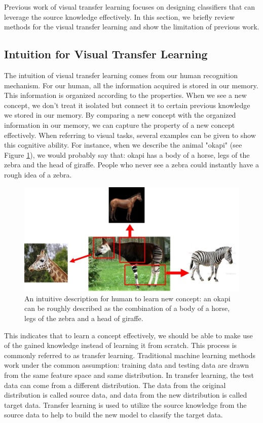 Previous work of visual transfer learning focuses on designing classifiers that can leverage the source knowledge effectively. In this section, we briefly review methods for the visual transfer learning and show the limitation of previous work. 
\subsection{Intuition for Visual Transfer Learning}
The intuition of visual transfer learning comes from our human recognition mechanism. For our human, all the information acquired is stored in our memory. This information is organized according to the properties. When we see a new concept, we don't treat it isolated but connect it to certain previous knowledge we stored in our memory. By comparing a new concept with the organized information in our memory, we can capture the property of a new concept effectively. When referring to visual tasks, several examples can be given to show this cognitive ability. For instance, when we describe the animal "okapi" (see Figure \ref{fig:intro:multi}), we would probably say that: okapi has a body of a horse, legs of the zebra and the head of giraffe. People who never see a zebra could instantly have a rough idea of a zebra. 

\begin{figure}
	\centering
	\includegraphics[scale=.6]{introduction/fig/multiple.jpg}
	\caption{An intuitive description for human to learn new concept: an okapi can be roughly described as the combination of a body of a horse, legs of the zebra and a head of giraffe.}\label{fig:intro:multi}
\end{figure}

This indicates that to learn a concept effectively, we should be able to make use of the gained knowledge instead of learning it from scratch. This process is commonly referred to as transfer learning\cite{pan2010survey}. Traditional machine learning methods work under the common assumption: training data and testing data are drawn from the same feature space and same distribution. 
In transfer learning, the test data can come from a different distribution. The data from the original distribution is called source data, and data from the new distribution is called target data. Transfer learning is used to utilize the source knowledge from the source data to help to build the new model to classify the target data. 

